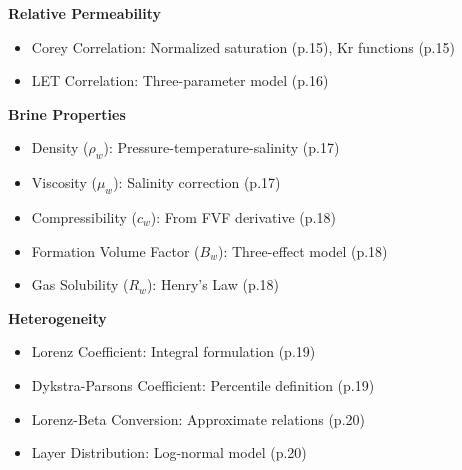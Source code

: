 \documentclass[11pt,a4paper]{article}
\begin{document}
\textbf{Relative Permeability}
\begin{itemize}
\item Corey Correlation: Normalized saturation (p.15), Kr functions (p.15)
\item LET Correlation: Three-parameter model (p.16)
\end{itemize}

\textbf{Brine Properties}
\begin{itemize}
\item Density ($\rho_w$): Pressure-temperature-salinity (p.17)
\item Viscosity ($\mu_w$): Salinity correction (p.17)
\item Compressibility ($c_w$): From FVF derivative (p.18)
\item Formation Volume Factor ($B_w$): Three-effect model (p.18)
\item Gas Solubility ($R_w$): Henry's Law (p.18)
\end{itemize}

\textbf{Heterogeneity}
\begin{itemize}
\item Lorenz Coefficient: Integral formulation (p.19)
\item Dykstra-Parsons Coefficient: Percentile definition (p.19)
\item Lorenz-Beta Conversion: Approximate relations (p.20)
\item Layer Distribution: Log-normal model (p.20)
\end{itemize}
\end{document}

